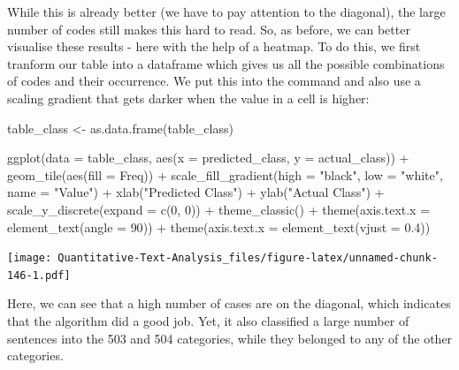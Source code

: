 \documentclass[
]{book}
\newenvironment{Shaded}{\begin{snugshade}}{\end{snugshade}}
\newcommand{\AttributeTok}[1]{\textcolor[rgb]{0.77,0.63,0.00}{#1}}
\newcommand{\DecValTok}[1]{\textcolor[rgb]{0.00,0.00,0.81}{#1}}
\newcommand{\FloatTok}[1]{\textcolor[rgb]{0.00,0.00,0.81}{#1}}
\newcommand{\FunctionTok}[1]{\textcolor[rgb]{0.00,0.00,0.00}{#1}}
\newcommand{\NormalTok}[1]{#1}
\newcommand{\OtherTok}[1]{\textcolor[rgb]{0.56,0.35,0.01}{#1}}
\newcommand{\SpecialCharTok}[1]{\textcolor[rgb]{0.00,0.00,0.00}{#1}}
\newcommand{\StringTok}[1]{\textcolor[rgb]{0.31,0.60,0.02}{#1}}
\begin{document}
While this is already better (we have to pay attention to the diagonal), the large number of codes still makes this hard to read. So, as before, we can better visualise these results - here with the help of a heatmap. To do this, we first tranform our table into a dataframe which gives us all the possible combinations of codes and their occurrence. We put this into the command and also use a scaling gradient that gets darker when the value in a cell is higher:

\begin{Shaded}
\begin{Highlighting}[]
\NormalTok{table\_class }\OtherTok{\textless{}{-}} \FunctionTok{as.data.frame}\NormalTok{(table\_class)}

\FunctionTok{ggplot}\NormalTok{(}\AttributeTok{data =}\NormalTok{ table\_class, }\FunctionTok{aes}\NormalTok{(}\AttributeTok{x =}\NormalTok{ predicted\_class, }\AttributeTok{y =}\NormalTok{ actual\_class)) }\SpecialCharTok{+}
    \FunctionTok{geom\_tile}\NormalTok{(}\FunctionTok{aes}\NormalTok{(}\AttributeTok{fill =}\NormalTok{ Freq)) }\SpecialCharTok{+} \FunctionTok{scale\_fill\_gradient}\NormalTok{(}\AttributeTok{high =} \StringTok{"black"}\NormalTok{,}
    \AttributeTok{low =} \StringTok{"white"}\NormalTok{, }\AttributeTok{name =} \StringTok{"Value"}\NormalTok{) }\SpecialCharTok{+} \FunctionTok{xlab}\NormalTok{(}\StringTok{"Predicted Class"}\NormalTok{) }\SpecialCharTok{+}
    \FunctionTok{ylab}\NormalTok{(}\StringTok{"Actual Class"}\NormalTok{) }\SpecialCharTok{+} \FunctionTok{scale\_y\_discrete}\NormalTok{(}\AttributeTok{expand =} \FunctionTok{c}\NormalTok{(}\DecValTok{0}\NormalTok{, }\DecValTok{0}\NormalTok{)) }\SpecialCharTok{+}
    \FunctionTok{theme\_classic}\NormalTok{() }\SpecialCharTok{+} \FunctionTok{theme}\NormalTok{(}\AttributeTok{axis.text.x =} \FunctionTok{element\_text}\NormalTok{(}\AttributeTok{angle =} \DecValTok{90}\NormalTok{)) }\SpecialCharTok{+}
    \FunctionTok{theme}\NormalTok{(}\AttributeTok{axis.text.x =} \FunctionTok{element\_text}\NormalTok{(}\AttributeTok{vjust =} \FloatTok{0.4}\NormalTok{))}
\end{Highlighting}
\end{Shaded}

\texttt{[image: Quantitative-Text-Analysis\_files/figure-latex/unnamed-chunk-146-1.pdf]}

Here, we can see that a high number of cases are on the diagonal, which indicates that the algorithm did a good job. Yet, it also classified a large number of sentences into the 503 and 504 categories, while they belonged to any of the other categories.
\end{document}
